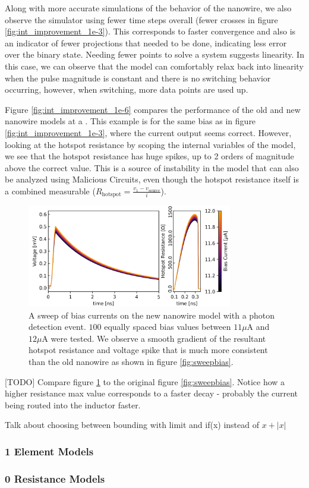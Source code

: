Along with more accurate simulations of the behavior of the nanowire, we also
observe the simulator using fewer time steps overall (fewer crosses in figure 
\ref{fig:int_improvement_1e-3}). This corresponds to faster convergence and also is
an indicator of fewer projections that needed to be done, indicating less
error over the binary state. Needing fewer points to solve a system suggests
linearity. In this case, we can observe that the model can comfortably relax
back into linearity when the pulse magnitude is constant and there is no
switching behavior occurring, however, when switching, more data points are used up.

Figure \ref{fig:int_improvement_1e-6} compares the performance of the old and new 
nanowire models at a . This example is for the same bias as in 
figure \ref{fig:int_improvement_1e-3}, where the current output seems correct.
However, looking at the hotspot resistance by scoping the internal variables of the 
model, we see that the hotspot resistance has huge spikes, up to 2 orders of magnitude
above the correct value. This is a source of instability in the model that can also
be analyzed using Malicious Circuits, even though the hotspot resistance itself is
a combined measurable ($R_{\mathrm{hotspot}} = \frac{v_1 - v_{\mathrm{source}}}{i}$).

\begin{figure}
    \centering
    \includegraphics[width=0.8\textwidth]{figs/not_jumbled_mess.png}
    \caption{A sweep of bias currents on the new nanowire model with a photon detection event.
    $100$ equally spaced bias values between $11\mu$A and $12\mu$A were tested. We observe
    a smooth gradient of the resultant
    hotspot resistance and voltage spike that is much more consistent than the old nanowire
    as shown in figure \ref{fig:sweepbias}. 
    }
    \label{fig:not_jumbled_mess}
\end{figure}

[TODO] Compare figure \ref{fig:not_jumbled_mess} to the original figure \ref{fig:sweepbias}.
Notice how a higher resistance max value corresponds to a faster decay - probably the current
being routed into the inductor faster.

Talk about choosing between bounding with limit and if(x) instead of $x+|x|$

\subsubsection{1 Element Models}

\subsubsection{0 Resistance Models}